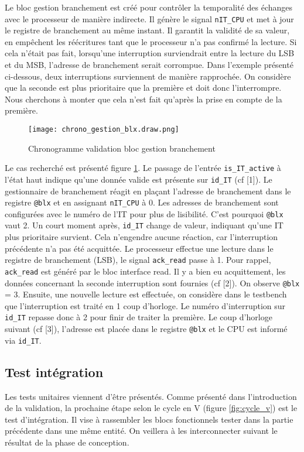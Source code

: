 Le bloc gestion branchement est créé pour contrôler la temporalité des échanges avec le processeur de manière indirecte.
Il génère le signal \texttt{nIT\_CPU} et met à jour le registre de branchement au même instant.
Il garantit la validité de sa valeur, en empêchent les réécritures tant que le processeur n'a pas confirmé la lecture.
Si cela n'était pas fait, lorsqu'une interruption surviendrait entre la lecture du LSB et du MSB, l'adresse de branchement serait corrompue.
Dans l'exemple présenté ci-dessous, deux interruptions surviennent de manière rapprochée.
On considère que la seconde est plus prioritaire que la première et doit donc l'interrompre.
Nous cherchons à monter que cela n'est fait qu'après la prise en compte de la première.
\begin{figure}[H]
    \centering
    \texttt{[image: chrono\_gestion\_blx.draw.png]}
    \caption{Chronogramme validation bloc gestion branchement}
    \label{fig:chrono_blx}
\end{figure}
Le cas recherché est présenté figure \ref{fig:chrono_blx}.
Le passage de l'entrée \texttt{is\_IT\_active} à l'état haut indique qu'une donnée valide est présente sur \texttt{id\_IT} (cf [1]).
Le gestionnaire de branchement réagit en plaçant l'adresse de branchement dans le registre \texttt{@blx} et en assignant \texttt{nIT\_CPU} à 0.
Les adresses de branchement sont configurées avec le numéro de l'IT pour plus de lisibilité.
C'est pourquoi \texttt{@blx} vaut 2.
Un court moment après, \texttt{id\_IT} change de valeur, indiquant qu'une IT plus prioritaire survient.
Cela n'engendre aucune réaction, car l'interruption précédente n'a pas été acquittée.
Le processeur effectue une lecture dans le registre de branchement (LSB), le signal \texttt{ack\_read} passe à 1.
Pour rappel, \texttt{ack\_read} est généré par le bloc interface read.
Il y a bien eu acquittement, les données concernant la seconde interruption sont fournies (cf [2]).
On observe \texttt{@blx} = 3.
Ensuite, une nouvelle lecture est effectuée, on considère dans le testbench que l'interruption est traité en 1 coup d'horloge.
Le numéro d'interruption sur \texttt{id\_IT} repasse donc à 2 pour finir de traiter la première.
Le coup d'horloge suivant (cf [3]), l'adresse est placée dans le registre \texttt{@blx} et le CPU est informé via \texttt{id\_IT}.

\subsection{Test intégration}
Les tests unitaires viennent d'être présentés. 
Comme présenté dans l'introduction de la validation, la prochaine étape selon le cycle en V (figure \ref{fig:cycle_v}) est le test d'intégration.
Il vise à rassembler les blocs fonctionnels tester dans la partie précédente dans une même entité.
On veillera à les interconnecter suivant le résultat de la phase de conception.

